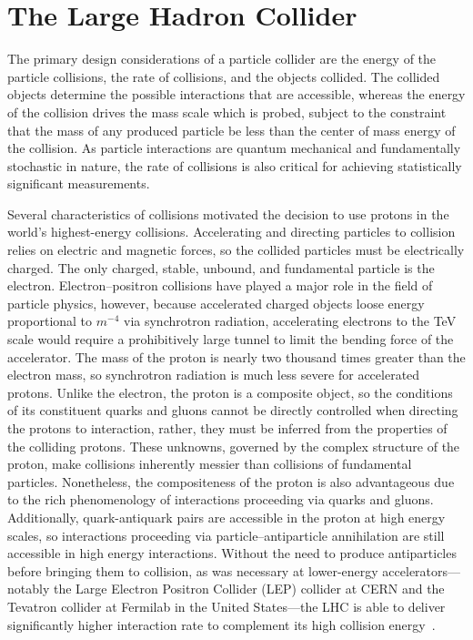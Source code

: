 \section{The Large Hadron Collider}
The primary design considerations of a particle collider are the energy
of the particle collisions, the rate of collisions, and the objects collided.
The collided objects determine the possible interactions that are accessible,
whereas the energy of the collision drives the mass scale which is probed,
subject to the constraint that the mass of any produced particle be less than the 
center of mass energy of the collision. As particle interactions are quantum mechanical 
and fundamentally stochastic in nature, the rate of collisions is also 
critical for achieving statistically significant measurements.

Several characteristics of \pp collisions motivated the decision 
to use protons in the world's highest-energy collisions. Accelerating and
directing particles to collision relies on electric and magnetic forces,
so the collided particles must be electrically charged. 
The only charged, stable, unbound, and fundamental particle is the electron.
Electron--positron collisions have played a major role in the field 
of particle physics, however, because accelerated charged objects
loose energy proportional to $m^{-4}$ via synchrotron radiation,
accelerating electrons to the TeV scale would require a prohibitively large tunnel
to limit the bending force of the accelerator.
The mass of the proton is nearly two thousand times greater than the 
electron mass, so synchrotron radiation is much less severe for accelerated protons.
Unlike the electron, the proton is a composite object, so the conditions of its constituent
quarks and gluons cannot be directly controlled when
directing the protons to interaction, rather, they must be inferred from 
the properties of the colliding protons. These unknowns, governed by the 
complex structure of the proton, make \pp collisions inherently
messier than collisions of fundamental particles. Nonetheless, the compositeness
of the proton is also advantageous due to the rich phenomenology of interactions
proceeding via quarks and gluons. 
Additionally, quark-antiquark pairs are accessible in the proton at high energy
scales, so interactions proceeding via particle--antiparticle annihilation
are still accessible in high energy \pp interactions. Without the need 
to produce antiparticles before bringing them to collision, as was necessary
at lower-energy accelerators---notably the Large Electron Positron Collider (LEP) collider
at CERN and the Tevatron collider at Fermilab in the United States---the LHC is
able to deliver significantly higher interaction rate to complement its high
collision energy~\cite{Nielsen:2011kc}.

